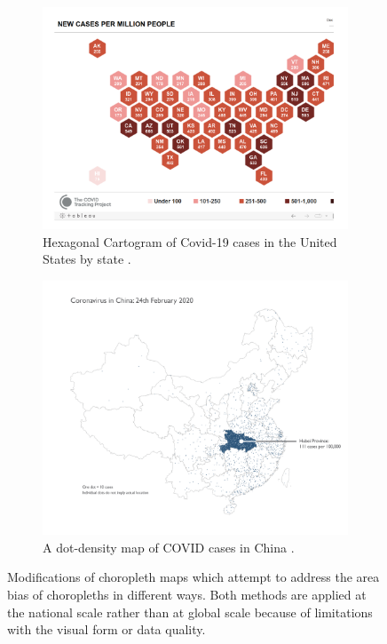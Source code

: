 \documentclass[article]{jdssv}\usepackage[]{graphicx}\usepackage[]{xcolor}
\begin{document}
\begin{figure}
\centering
\begin{subfigure}[c]{\textwidth}
\centering
\includegraphics[width=.65\textwidth]{covid-tracking-hex-cartogram}
\caption{Hexagonal Cartogram of Covid-19 cases in the United States by state \citep{StateCases1M2021}.}\label{fig:hex-cartogram}
\end{subfigure}

\begin{subfigure}[c]{\textwidth}
\centering
\includegraphics[width=\textwidth]{china-dotmap}
\caption{A dot-density map of COVID cases in China \citep{fieldMappingCoronavirusResponsibly}.}\label{fig:china-dot-map}
\end{subfigure}
\caption{Modifications of choropleth maps which attempt to address the area bias of choropleths in different ways. Both methods are applied at the national scale rather than at global scale because of limitations with the visual form or data quality.}
\end{figure}
\end{document}
